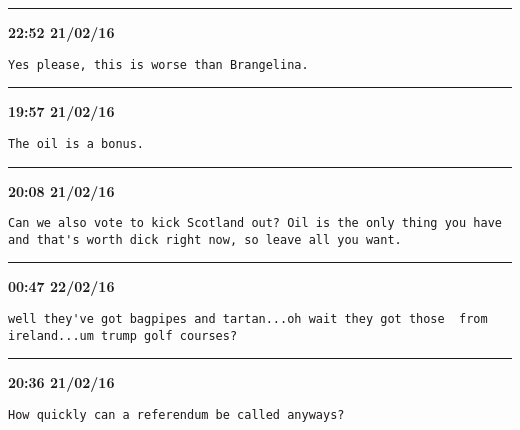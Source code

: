 \hrule%

\begin{adjustwidth}{2cm}{0cm}
\footnotesize \textbf{22:52 21/02/16}

\begin{lstlisting}[breaklines, breakatwhitespace, basicstyle=\small, frame=leftline]
Yes please, this is worse than Brangelina.
\end{lstlisting}
\end{adjustwidth}

\hrule%

\begin{adjustwidth}{0cm}{0cm}
\footnotesize \textbf{19:57 21/02/16}

\begin{lstlisting}[breaklines, breakatwhitespace, basicstyle=\small, frame=leftline]
The oil is a bonus.
\end{lstlisting}
\end{adjustwidth}

\hrule%

\begin{adjustwidth}{0cm}{0cm}
\footnotesize \textbf{20:08 21/02/16}

\begin{lstlisting}[breaklines, breakatwhitespace, basicstyle=\small, frame=leftline]
Can we also vote to kick Scotland out? Oil is the only thing you have and that's worth dick right now, so leave all you want. 
\end{lstlisting}
\end{adjustwidth}

\hrule%

\begin{adjustwidth}{2cm}{0cm}
\footnotesize \textbf{00:47 22/02/16}

\begin{lstlisting}[breaklines, breakatwhitespace, basicstyle=\small, frame=leftline]
well they've got bagpipes and tartan...oh wait they got those  from ireland...um trump golf courses?
\end{lstlisting}
\end{adjustwidth}

\hrule%

\begin{adjustwidth}{0cm}{0cm}
\footnotesize \textbf{20:36 21/02/16}

\begin{lstlisting}[breaklines, breakatwhitespace, basicstyle=\small, frame=leftline]
How quickly can a referendum be called anyways?
\end{lstlisting}
\end{adjustwidth}


